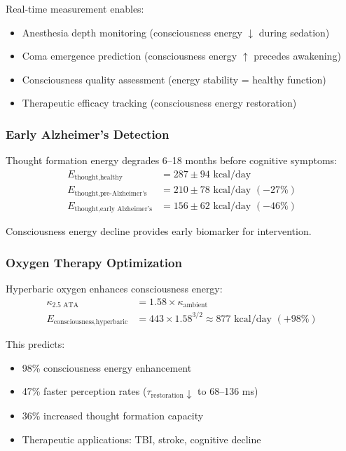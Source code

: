 \documentclass[12pt]{article}
\theoremstyle{remark}
\begin{document}
Real-time measurement enables:
\begin{itemize}
\item Anesthesia depth monitoring (consciousness energy $\downarrow$ during sedation)
\item Coma emergence prediction (consciousness energy $\uparrow$ precedes awakening)
\item Consciousness quality assessment (energy stability = healthy function)
\item Therapeutic efficacy tracking (consciousness energy restoration)
\end{itemize}

\subsubsection{Early Alzheimer's Detection}

Thought formation energy degrades 6--18 months before cognitive symptoms:
\begin{align}
E_{\text{thought,healthy}} &= 287 \pm 94 \text{ kcal/day} \\
E_{\text{thought,pre-Alzheimer's}} &= 210 \pm 78 \text{ kcal/day } (-27\%) \\
E_{\text{thought,early Alzheimer's}} &= 156 \pm 62 \text{ kcal/day } (-46\%)
\end{align}

Consciousness energy decline provides early biomarker for intervention.

\subsubsection{Oxygen Therapy Optimization}

Hyperbaric oxygen enhances consciousness energy:
\begin{align}
\kappa_{\text{2.5 ATA}} &= 1.58 \times \kappa_{\text{ambient}} \\
E_{\text{consciousness,hyperbaric}} &= 443 \times 1.58^{3/2} \approx 877 \text{ kcal/day } (+98\%)
\end{align}

This predicts:
\begin{itemize}
\item 98\% consciousness energy enhancement
\item 47\% faster perception rates ($\tau_{\text{restoration}} \downarrow$ to 68--136 ms)
\item 36\% increased thought formation capacity
\item Therapeutic applications: TBI, stroke, cognitive decline
\end{itemize}
\end{document}
